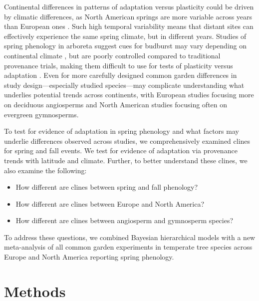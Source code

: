 \documentclass{article}
\begin{document}
Continental differences in patterns of adaptation versus plasticity could be driven by climatic differences, as North American springs are more variable across years than European ones \citep{tward21,zohner2017,schwartz00}. Such high temporal variability means that distant sites can effectively experience the same spring climate, but in different years. Studies of spring phenology in arboreta suggest cues for budburst may vary depending on continental climate \citep{zohner2017}, but are poorly controlled compared to traditional provenance trials, making them difficult to use for tests of plasticity versus adaptation \citep{gauzere2020}. Even for more carefully designed common garden differences in study design---especially studied species---may complicate understanding what underlies potential trends across continents, with European studies focusing more on deciduous angiosperms and North American studies focusing often on evergreen gymnosperms.  

To test for evidence of adaptation in spring phenology and what factors may underlie differences observed across studies, we comprehensively examined clines for spring and fall events. We test for evidence of adaptation via provenance trends with latitude and climate. Further, to better understand these clines, we also examine the following:
\begin{itemize}
\item How different are clines between spring and fall phenology? 
\item How different are clines between Europe and North America?
\item How different are clines between angiosperm and gymnosperm species?
\end{itemize}
To address these questions, we combined Bayesian hierarchical models with a new meta-analysis of all common garden experiments in temperate tree species across Europe and North America reporting spring phenology. 

\section{Methods}
\end{document}
